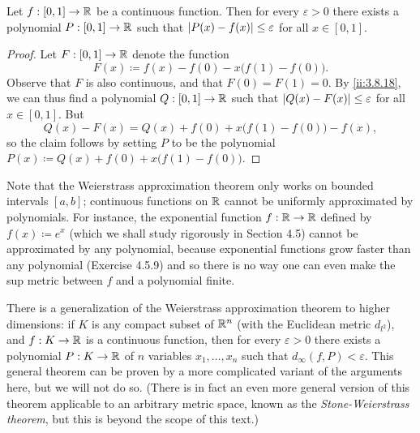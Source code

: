 \begin{cor}\label{ii:3.8.19}
  Let \(f : [0, 1] \to \mathbb{R}\) be a continuous function.
  Then for every \(\varepsilon > 0\) there exists a polynomial \(P : [0, 1] \to \mathbb{R}\) such that \(\left\lvert P(x) - f(x)\right\rvert \leq \varepsilon\) for all \(x \in [0, 1]\).
\end{cor}

\begin{proof}
  Let \(F : [0, 1] \to \mathbb{R}\) denote the function
  \[
    F(x) \coloneqq f(x) - f(0) - x \big(f(1) - f(0)\big).
  \]
  Observe that \(F\) is also continuous, and that \(F(0) = F(1) = 0\).
  By \cref{ii:3.8.18}, we can thus find a polynomial \(Q : [0, 1] \to \mathbb{R}\) such that \(\left\lvert Q(x) - F(x)\right\rvert \leq \varepsilon\) for all \(x \in [0, 1]\).
  But
  \[
    Q(x) - F(x) = Q(x) + f(0) + x \big(f(1) - f(0)\big) - f(x),
  \]
  so the claim follows by setting \(P\) to be the polynomial \(P(x) \coloneqq Q(x) + f(0) + x \big(f(1) - f(0)\big)\).
\end{proof}

\begin{rmk}\label{ii:3.8.20}
  Note that the Weierstrass approximation theorem only works on bounded intervals \([a, b]\);
  continuous functions on \(\mathbb{R}\) cannot be uniformly approximated by polynomials.
  For instance, the exponential function \(f : \mathbb{R} \to \mathbb{R}\) defined by \(f(x) \coloneqq e^x\) (which we shall study rigorously in Section 4.5) cannot be approximated by any polynomial, because exponential functions grow faster than any polynomial (Exercise 4.5.9) and so there is no way one can even make the sup metric between \(f\) and a polynomial finite.
\end{rmk}

\begin{rmk}\label{ii:3.8.21}
  There is a generalization of the Weierstrass approximation theorem to higher dimensions:
  if \(K\) is any compact subset of \(\mathbb{R}^n\) (with the Euclidean metric \(d_{l^2}\)), and \(f : K \to \mathbb{R}\) is a continuous function, then for every \(\varepsilon > 0\) there exists a polynomial \(P : K \to \mathbb{R}\) of \(n\) variables \(x_1, \dots, x_n\) such that \(d_\infty(f, P) < \varepsilon\).
  This general theorem can be proven by a more complicated variant of the arguments here, but we will not do so.
  (There is in fact an even more general version of this theorem applicable to an arbitrary metric space, known as the \emph{Stone-Weierstrass theorem}, but this is beyond the scope of this text.)
\end{rmk}

